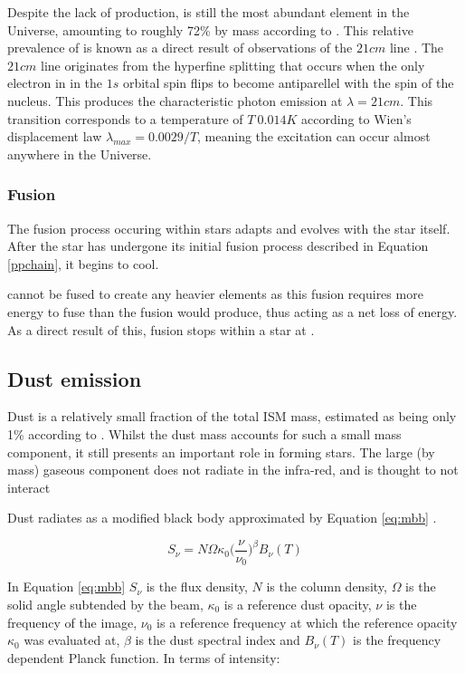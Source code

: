 \documentclass{report}
\begin{document}
Despite the lack of  production,  is still the most abundant element in the Universe, amounting to roughly 72\% by mass according to \textcite{abundance}. This relative prevalence of  is known as a direct result of observations of the $21cm$ line \parencite{21cm}. The $21cm$ line originates from the hyperfine splitting that occurs when the only electron in  in the $1s$ orbital spin flips to become antiparellel with the spin of the nucleus. This produces the characteristic photon emission at $\lambda=21cm$. This transition corresponds to a temperature of $T~0.014 K$ according to Wien's displacement law $\lambda_{max}=0.0029/T$, meaning the excitation can occur almost anywhere in the Universe.

\subsubsection{Fusion}
The fusion process occuring within stars adapts and evolves with the star itself. After the star has undergone its initial fusion process described in Equation \ref{ppchain}, it begins to cool.

 cannot be fused to create any heavier elements as this fusion requires more energy to fuse than the fusion would produce, thus acting as a net loss of energy. As a direct result of this, fusion stops within a star at .

\subsection{Dust emission}
Dust is a relatively small fraction of the total ISM mass, estimated as being only 1\% according to \textcite{noise}. Whilst the dust mass accounts for such a small mass component, it still presents an important role in forming stars. The large (by mass) gaseous component does not radiate in the infra-red, and is thought to not interact

Dust radiates as a modified black body approximated by Equation \ref{eq:mbb} \parencite{noise}.

\begin{equation} \label{eq:mbb}
  S_{\nu} = N \Omega \kappa_{0} \Big(\frac{\nu}{\nu_{0}}\Big)^{\beta} B_{\nu}(T)
\end{equation}

In Equation \ref{eq:mbb} $S_{\nu}$ is the flux density, $N$ is the column density, $\Omega$ is the solid angle subtended by the beam, $\kappa_{0}$ is a reference dust opacity, $\nu$ is the frequency of the image, $\nu_{0}$ is a reference frequency at which the reference opacity $\kappa_{0}$ was evaluated at, $\beta$ is the dust spectral index and $B_{\nu}(T)$ is the frequency dependent Planck function. In terms of intensity:
\end{document}
